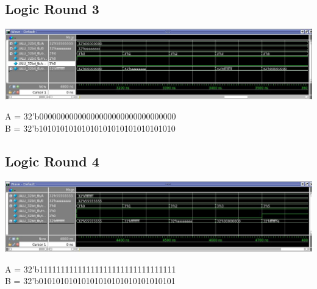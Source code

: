 \documentclass[paper=letter, fontsize=11pt]{scrartcl}
\numberwithin{equation}{section} %
\numberwithin{figure}{section} %
\numberwithin{table}{section} %
\begin{document}
\subsection{Logic Round 3}

	\centering
			\includegraphics[width=1.0\textwidth]{Log3}
				\label{fig:Log3}
\raggedright A = 32'b00000000000000000000000000000000\\ 
B = 32'b10101010101010101010101010101010

\subsection{Logic Round 4}

	\centering
			\includegraphics[width=1.0\textwidth]{Log4}
				\label{fig:Log4}
\raggedright A = 32'b11111111111111111111111111111111\\
B = 32'b01010101010101010101010101010101
\end{document}
